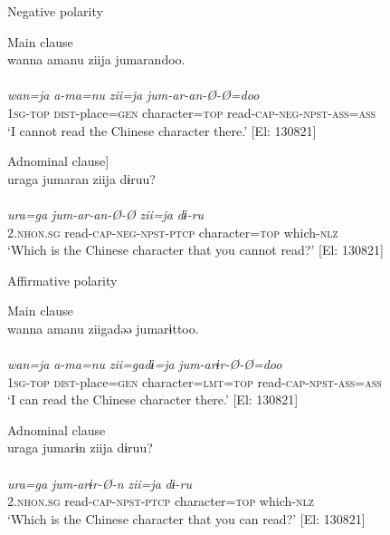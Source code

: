 \ea\label{ex:8-8}
  Negative polarity

\ea Main clause\\
\glll    wanna  amanu  ziija  jumarandoo.\\\\
    \textit{wan=ja}  \textit{a-ma=nu}  \textit{zii=ja}  \textit{jum-ar-an-Ø-Ø=doo}\\
    1\textsc{sg}-\textsc{top}  \textsc{dist}-place=\textsc{gen}  character=\textsc{top}  read-\textsc{cap}-\textsc{neg}-\textsc{npst}-\textsc{ass}=\textsc{ass}\\
\glt \glt ‘I cannot read the Chinese character there.’ [El: 130821]


\ex Adnominal clause]\\
\glll     uraga  jumaran  ziija  dɨruu?\\\\
    \textit{ura=ga}  \textit{jum-ar-an-Ø-Ø}  \textit{zii=ja}  \textit{dɨ-ru}\\
    2.\textsc{nhon}.\textsc{sg}  read-\textsc{cap}-\textsc{neg}-\textsc{npst}-\textsc{ptcp}  character=\textsc{top}  which-\textsc{nlz}\\
\glt\glt ‘Which is the Chinese character that you cannot read?’ [El: 130821]

  Affirmative polarity

\ex Main clause\\
\glll     wanna  amanu  ziigadəə  jumarɨttoo.\\\\
    \textit{wan=ja}  \textit{a-ma=nu}  \textit{zii=gadɨ=ja}  \textit{jum-arɨr-Ø-Ø=doo}\\
    1\textsc{sg}-\textsc{top}  \textsc{dist}-place=\textsc{gen}  character=\textsc{lmt}=\textsc{top}  read-\textsc{cap}-\textsc{npst}-\textsc{ass}=\textsc{ass}\\
\glt ‘I can read the Chinese character there.’ [El: 130821]


\ex Adnominal clause\\
\glll     uraga  jumarɨn  ziija  dɨruu?\\\\
    \textit{ura=ga}  \textit{jum-arɨr-Ø-n}  \textit{zii=ja}  \textit{dɨ-ru}\\
    2.\textsc{nhon}.\textsc{sg}  read-\textsc{cap}-\textsc{npst}-\textsc{ptcp}  character=\textsc{top}  which-\textsc{nlz}\\
\glt  ‘Which is the Chinese character that you can read?’ [El: 130821]
\z
\z


